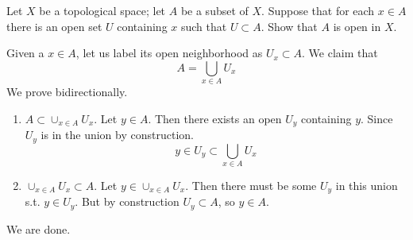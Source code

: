   \begin{exercise}[Munkres 13.1]
    Let $X$ be a topological space; let $A$ be a subset of $X$. Suppose that for each $x \in A$ there is an open set $U$ containing $x$ such that $U \subset A$. Show that $A$ is open in $X$.
  \end{exercise}
  \begin{solution}[Munkres 13.1]
    Given a $x \in A$, let us label its open neighborhood as $U_x \subset A$. We claim that 
    \begin{equation}
      A = \bigcup_{x \in A} U_x
    \end{equation} 
    We prove bidirectionally. 
    \begin{enumerate}
      \item $A \subset \cup_{x \in A} U_x$. Let $y \in A$. Then there exists an open $U_y$ containing $y$. Since $U_y$ is in the union by construction. 
      \begin{equation}
        y \in U_y \subset \bigcup_{x \in A} U_x
      \end{equation}
      \item $\cup_{x \in A} U_x \subset A$. Let $y \in \cup_{x \in A} U_x$. Then there must be some $U_y$ in this union s.t. $y \in U_y$. But by construction $U_y \subset A$, so $y \in A$. 
    \end{enumerate}
    We are done. 
  \end{solution}

